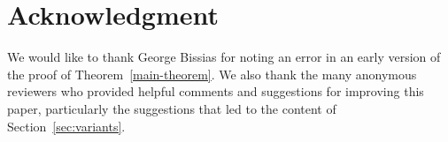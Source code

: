 \documentclass[]{lmcs}
\begin{document}
\section*{Acknowledgment}
We would like to thank George Bissias
for noting an error in an early version of the proof of 
Theorem~\ref{main-theorem}. 
We also thank the many anonymous reviewers who provided helpful
comments and suggestions for improving this paper, particularly the
suggestions that led to the content of Section~\ref{sec:variants}.




\end{document}
